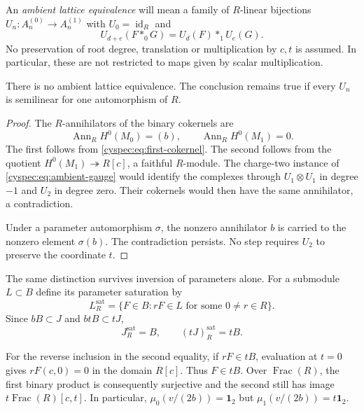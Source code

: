 An \emph{ambient lattice equivalence} will mean a family of
$R$-linear bijections $U_n:A_n^{(0)}\to A_n^{(1)}$ with $U_0=\operatorname{id}_R$
and
\begin{equation}\label{cyspec:eq:ambient-gauge}
 U_{d+e}(F*_0G)=U_d(F)*_1U_e(G).
\end{equation}
No preservation of root degree, translation or multiplication by
$c,t$ is assumed. In particular, these are not restricted to maps
given by scalar multiplication.

\begin{theorem}\label{cyspec:thm:ambient-obstruction}
There is no ambient lattice equivalence. The conclusion remains
true if every $U_n$ is semilinear for one automorphism of $R$.
\end{theorem}

\begin{proof}
The $R$-annihilators of the binary cokernels are
\[
 \operatorname{Ann}_R H^0(M_0)=(b),\qquad
 \operatorname{Ann}_R H^0(M_1)=0.
\]
The first follows from \eqref{cyspec:eq:first-cokernel}. The second
follows from the quotient $H^0(M_1)\twoheadrightarrow R[c]$, a
faithful $R$-module. The charge-two instance of
\eqref{cyspec:eq:ambient-gauge} would identify the complexes through
$U_1\otimes U_1$ in degree $-1$ and $U_2$ in degree zero.
Their cokernels would then have the same annihilator, a contradiction.

Under a parameter automorphism $\sigma$, the nonzero annihilator
$b$ is carried to the nonzero element $\sigma(b)$. The contradiction
persists. No step requires $U_2$ to preserve the coordinate $t$.
\end{proof}

The same distinction survives inversion of parameters alone.
For a submodule $L\subset B$ define its parameter saturation by
\[
 L_R^{\mathrm{sat}}=\{F\in B:rF\in L
                     \text{ for some }0\ne r\in R\}.
\]
Since $bB\subset J$ and $btB\subset tJ$,
\begin{equation}\label{cyspec:eq:saturation}
 J_R^{\mathrm{sat}}=B,\qquad (tJ)_R^{\mathrm{sat}}=tB.
\end{equation}

For the reverse inclusion in the second equality, if $rF\in tB$,
evaluation at $t=0$ gives $rF(c,0)=0$ in the domain $R[c]$.
Thus $F\in tB$. Over $\operatorname{Frac}(R)$, the first binary
product is consequently surjective and the second still has image
$t\operatorname{Frac}(R)[c,t]$. In particular,
$\mu_0(v/(2b))=\mathbf1_2$ but $\mu_1(v/(2b))=t\mathbf1_2$.

